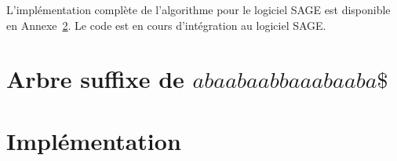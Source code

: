 \documentclass[10pt,letterpaper,oneside]{article}
\begin{document}
L'implémentation complète de l'algorithme pour le logiciel SAGE est disponible en Annexe~\ref{ann:code}. Le code est en cours d'intégration au logiciel SAGE.

\appendix
\newpage
\section{Arbre suffixe de $abaabaabbaaabaaba\$$} \label{ann:arbre}
\begin{figure}[htb]
    
\end{figure}

\newpage
\section{Implémentation} \label{ann:code}




\end{document}
